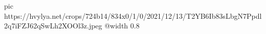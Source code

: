  
 
 
 
 

\ifcmt
  pic https://hvylya.net/crops/724b14/834x0/1/0/2021/12/13/T2YB6Ib83sLbgN7Ppdl2q7iFZJ62qSwLh2XOOl3z.jpeg
  @width 0.8
\fi

\begin{center}
\end{center}
